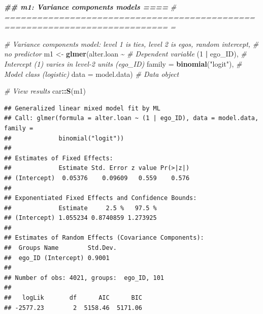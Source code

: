 \documentclass[
]{book}
\newenvironment{Shaded}{\begin{snugshade}}{\end{snugshade}}
\newcommand{\AttributeTok}[1]{\textcolor[rgb]{0.13,0.29,0.53}{#1}}
\newcommand{\CommentTok}[1]{\textcolor[rgb]{0.56,0.35,0.01}{\textit{#1}}}
\newcommand{\DecValTok}[1]{\textcolor[rgb]{0.00,0.00,0.81}{#1}}
\newcommand{\DocumentationTok}[1]{\textcolor[rgb]{0.56,0.35,0.01}{\textbf{\textit{#1}}}}
\newcommand{\FunctionTok}[1]{\textcolor[rgb]{0.13,0.29,0.53}{\textbf{#1}}}
\newcommand{\NormalTok}[1]{#1}
\newcommand{\OtherTok}[1]{\textcolor[rgb]{0.56,0.35,0.01}{#1}}
\newcommand{\SpecialCharTok}[1]{\textcolor[rgb]{0.81,0.36,0.00}{\textbf{#1}}}
\newcommand{\StringTok}[1]{\textcolor[rgb]{0.31,0.60,0.02}{#1}}
\begin{document}
\begin{Shaded}
\begin{Highlighting}[]
\DocumentationTok{\#\# m1: Variance components models                                           ====}
\CommentTok{\# ============================================================================ =}

\CommentTok{\# Variance components model: level 1 is ties, level 2 is egos, random intercept, }
\CommentTok{\# no predictor}
\NormalTok{m1 }\OtherTok{\textless{}{-}} \FunctionTok{glmer}\NormalTok{(alter.loan }\SpecialCharTok{\textasciitilde{}} \CommentTok{\# Dependent variable}
\NormalTok{              (}\DecValTok{1} \SpecialCharTok{|}\NormalTok{ ego\_ID), }\CommentTok{\# Intercept (1) varies in level{-}2 units (ego\_ID)}
            \AttributeTok{family =} \FunctionTok{binomial}\NormalTok{(}\StringTok{"logit"}\NormalTok{), }\CommentTok{\# Model class (logistic)}
            \AttributeTok{data =}\NormalTok{ model.data) }\CommentTok{\# Data object}

\CommentTok{\# View results}
\NormalTok{car}\SpecialCharTok{::}\FunctionTok{S}\NormalTok{(m1)}
\end{Highlighting}
\end{Shaded}

\begin{verbatim}
## Generalized linear mixed model fit by ML
## Call: glmer(formula = alter.loan ~ (1 | ego_ID), data = model.data, family =
##             binomial("logit"))
## 
## Estimates of Fixed Effects:
##             Estimate Std. Error z value Pr(>|z|)
## (Intercept)  0.05376    0.09609   0.559    0.576
## 
## Exponentiated Fixed Effects and Confidence Bounds:
##             Estimate     2.5 %   97.5 %
## (Intercept) 1.055234 0.8740859 1.273925
## 
## Estimates of Random Effects (Covariance Components):
##  Groups Name        Std.Dev.
##  ego_ID (Intercept) 0.9001  
## 
## Number of obs: 4021, groups:  ego_ID, 101
## 
##   logLik       df      AIC      BIC 
## -2577.23        2  5158.46  5171.06
\end{verbatim}

\begin{Shaded}
\end{Shaded}
\end{document}
